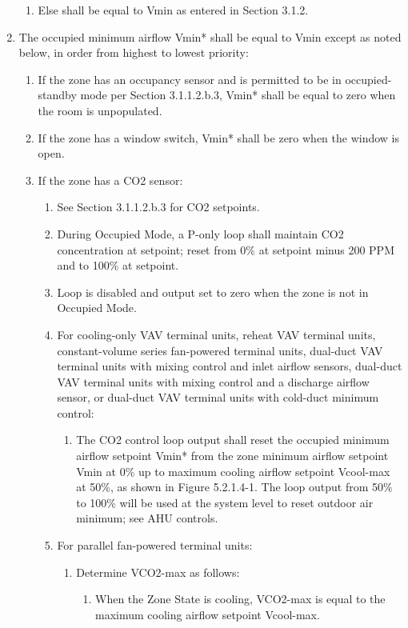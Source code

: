 \documentclass[10pt]{article}
\begin{document}
\begin{enumerate}
\begin{enumerate}
      \item Else shall be equal to Vmin as entered in Section 3.1.2.
    \end{enumerate}
    \item The occupied minimum airflow Vmin* shall be equal to Vmin except as noted below, in order from highest to lowest priority:
    \begin{enumerate}
      \item If the zone has an occupancy sensor and is permitted to be in occupied-standby mode per Section 3.1.1.2.b.3, Vmin* shall be equal to zero when the room is unpopulated.
      \item If the zone has a window switch, Vmin* shall be zero when the window is open.
      \item If the zone has a CO2 sensor:
      \begin{enumerate}
        \item See Section 3.1.1.2.b.3 for CO2 setpoints.
        \item During Occupied Mode, a P-only loop shall maintain CO2 concentration at setpoint; reset from 0\% at setpoint minus 200 PPM and to 100\% at setpoint. 
        \item Loop is disabled and output set to zero when the zone is not in Occupied Mode.
        \item For cooling-only VAV terminal units, reheat VAV terminal units, constant-volume series fan-powered terminal units, dual-duct VAV terminal units with mixing control and inlet airflow sensors, dual-duct VAV terminal units with mixing control and a discharge airflow sensor, or dual-duct VAV terminal units with cold-duct minimum control:
        \begin{enumerate}
          \item The CO2 control loop output shall reset the occupied minimum airflow setpoint Vmin* from the zone minimum airflow setpoint Vmin at 0\% up to maximum cooling airflow setpoint Vcool-max at 50\%, as shown in Figure 5.2.1.4-1. The loop output from 50\% to 100\% will be used at the system level to reset outdoor air minimum; see AHU controls.
        \end{enumerate}
        \item For parallel fan-powered terminal units:
        \begin{enumerate}
          \item Determine VCO2-max as follows:
          \begin{enumerate}
            \item When the Zone State is cooling, VCO2-max is equal to the maximum cooling airflow setpoint Vcool-max.

\end{enumerate}
\end{enumerate}
\end{enumerate}
\end{enumerate}
\end{enumerate}
\end{document}
